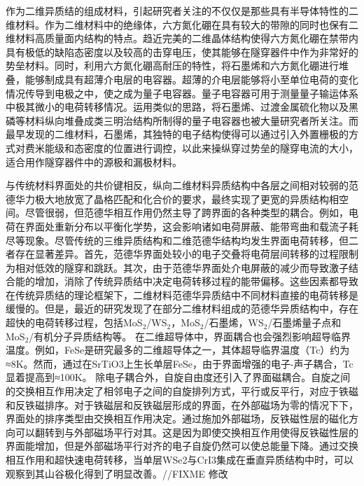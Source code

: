作为二维异质结的组成材料，引起研究者关注的不仅仅是那些具有半导体特性的二维材料。作为二维材料中的绝缘体，六方氮化硼在具有较大的带隙的同时也保有二维材料高质量面内结构的特点。趋近完美的二维晶体结构使得六方氮化硼在禁带内具有极低的缺陷态密度以及较高的击穿电压，使其能够在隧穿器件中作为非常好的势垒材料。同时，利用六方氮化硼高耐压的特性，将石墨烯和六方氮化硼进行堆叠，能够制成具有超薄介电层的电容器。超薄的介电层能够将小至单位电荷的变化情况传导到电极之中，使之成为量子电容器。量子电容器可用于测量量子输运体系中极其微小的电荷转移情况。运用类似的思路，将石墨烯、过渡金属硫化物以及黑磷等材料纵向堆叠成类三明治结构所制得的量子电容器也被大量研究者所关注。而最早发现的二维材料，石墨烯，其独特的电子结构使得可以通过引入外置栅极的方式对费米能级和态密度的位置进行调控，以此来操纵穿过势垒的隧穿电流的大小，适合用作隧穿器件中的源极和漏极材料。

与传统材料界面处的共价键相反，纵向二维材料异质结构中各层之间相对较弱的范德华力极大地放宽了晶格匹配和化合价的要求，最终实现了更宽的异质结构相空间。尽管很弱，但范德华相互作用仍然主导了跨界面的各种类型的耦合。例如，电荷在界面处重新分布以平衡化学势，这会影响诸如电荷屏蔽、能带弯曲和载流子耗尽等现象。尽管传统的三维异质结构和二维范德华结构均发生界面电荷转移，但二者存在显著差异。首先，范德华界面处较小的电子交叠将电荷层间转移的过程限制为相对低效的隧穿和跳跃。其次，由于范德华界面处介电屏蔽的减少而导致激子结合能的增加，消除了传统异质结中决定电荷转移过程的能带偏移。这些因素都导致在传统异质结的理论框架下，二维材料范德华异质结中不同材料直接的电荷转移是缓慢的。但是，最近的研究发现了在部分二维材料组成的范德华异质结构中，存在超快的电荷转移过程，包括MoS$_2$/WS$_2$，MoS$_2$/石墨烯，WS$_2$/石墨烯量子点和MoS$_2$/有机分子异质结构等。%
在二维超导体中，界面耦合也会强烈影响超导临界温度。例如，FeSe是研究最多的二维超导体之一，其体超导临界温度（Tc）约为≈8K。然而，通过在SrTiO3上生长单层FeSe，由于界面增强的电子-声子耦合，Tc显着提高到≈100K。
除电子耦合外，自旋自由度还引入了界面磁耦合。自旋之间的交换相互作用决定了相邻电子之间的自旋排列方式，平行或反平行，对应于铁磁和反铁磁排序。对于铁磁层和反铁磁层形成的界面，在外部磁场为零的情况下下，界面处的排序类型由交换相互作用决定。通过施加外部磁场，反铁磁性层的磁化方向可以翻转到与外部磁场平行对其。这是因为即使交换相互作用使得反铁磁性层的界面能增加，但是外部磁场平行对齐的电子自旋仍然可以使总能量下降。通过交换相互作用和超快速电荷转移，当单层WSe2与CrI3集成在垂直异质结构中时，可以观察到其山谷极化得到了明显改善。//FIXME 修改

